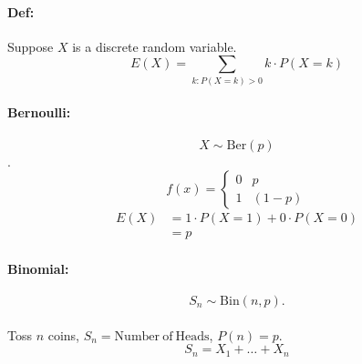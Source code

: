 \documentclass[letterpaper,12pt]{article}
\begin{document}
\paragraph{Def:}Suppose $X$ is a discrete random variable.
\[
    E(X) = \sum_{k: P(X = k) > 0} k \cdot P(X=k)
\]
\paragraph{Bernoulli:}$$X \sim \mathrm{Ber}(p)$$.
\[ f(x) = \begin{cases}
    0 & p\\
    1 & (1-p)
    \end{cases}
\]
\begin{align*}
    E(X) &= 1\cdot P(X=1) + 0\cdot P(X=0)\\
        &= p
\end{align*}
\paragraph{Binomial:}$$ S_n \sim \mathrm{Bin}(n,p).$$
\paragraph{}Toss $n$ coins, $S_n = \mathrm{Number~of~Heads}$, $P(n) = p$.
$$S_n = X_1 + \ldots + X_n$$
\end{document}
